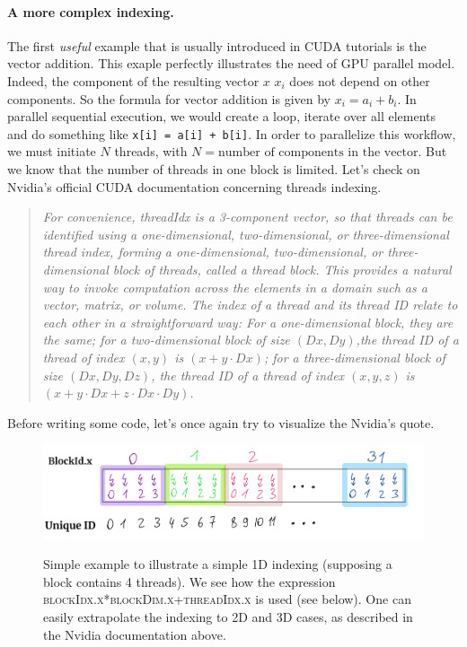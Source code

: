 \documentclass[12pt]{article}
\begin{document}
\paragraph{A more complex indexing.} The first \textit{useful} example 
that is usually introduced in CUDA tutorials is the vector addition. This exaple
perfectly illustrates the need of GPU parallel model. Indeed, the component of the resulting
 vector $x$ $x_i$ does not depend on other components. So the formula for vector addition is given by 
 $x_i = a_i + b_i$. In parallel sequential execution, we would create a loop, iterate over all elements and 
do something like \verb|x[i] = a[i] + b[i]|. In order to parallelize this workflow, we must initiate $N$ 
threads, with $N = \text{number of components in the vector}$. But we know that the number of threads in one 
block is limited. Let's check on Nvidia's official CUDA documentation concerning threads indexing. 
\begin{quote}
   \textsl{For convenience, {\selectfont threadIdx} is a 3-component vector, 
   so that threads can be identified using a one-dimensional, 
   two-dimensional, or three-dimensional thread index, forming a one-dimensional, two-dimensional, 
   or three-dimensional block of threads, called a thread block. This provides a natural way to invoke computation across 
   the elements in a domain such as a vector, matrix, or volume.
   The index of a thread and its thread ID relate to each other 
   in a straightforward way: For a one-dimensional block, they are the same; for 
   a two-dimensional block of size $(Dx, Dy)$,the thread ID of a thread 
   of index $(x, y)$ is $(x + y\cdot Dx)$; for a three-dimensional block of size $(Dx, Dy, Dz)$, the thread ID of a 
   thread of index $(x, y, z)$ is $(x + y\cdot Dx + z\cdot Dx\cdot Dy)$.}
\end{quote}

Before writing some code, let's once again try to visualize the Nvidia's quote.
\begin{figure}[H]
   \centering
   \includegraphics[scale=0.25]{tindexing.png}
   \label{tindexing}
   \caption{Simple example to illustrate a simple 1D indexing (supposing a block 
   contains 4 threads). We see how the expression \textsc{blockIdx.x*blockDim.x+threadIdx.x} is used (see below). 
   One can easily extrapolate the indexing to 2D and 3D cases, as described in the Nvidia documentation above.
   }
\end{figure}
\end{document}
